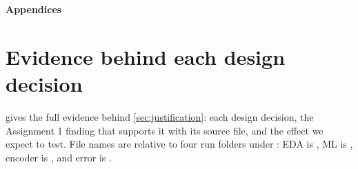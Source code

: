 \onecolumn
\raggedbottom
\begin{center}
{\LARGE\bfseries Appendices}
\end{center}
\vspace{4pt}
\appendix
{}

\section{Evidence behind each design decision}
\label{app:evidence}

 gives the full evidence behind \cref{sec:justification}: each design decision, the Assignment 1 finding that supports it with its source file, and the effect we expect to test. File names are relative to four run folders under : EDA is , ML is , encoder is , and error is .

